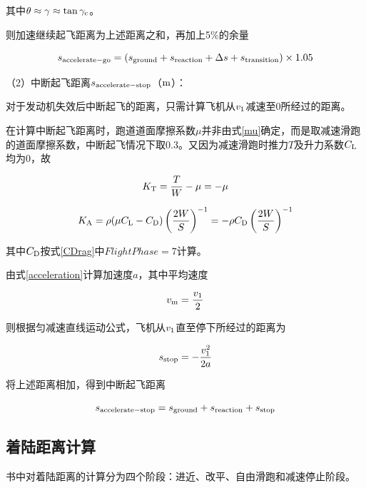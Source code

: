 \documentclass[a4paper,punct,space,heading=true,AutoFakeBold]{ctexrep}
\begin{document}
其中$\theta\approx\gamma\approx\tan\gamma_{\rm c}$。

则加速继续起飞距离为上述距离之和，再加上5\%的余量

\begin{equation}
s_{\rm accelerate-go}=\left(s_{\rm ground}+s_{\rm reaction}+\Delta s+s_{\rm transition}\right)\times 1.05
\end{equation}

（2）中断起飞距离$s_{\rm accelerate-stop}$（$\rm m$）：

对于发动机失效后中断起飞的距离，只需计算飞机从$v_{\rm 1}$减速至0所经过的距离。

在计算中断起飞距离时，跑道道面摩擦系数$\mu$并非由式\ref{mu}确定，而是取减速滑跑的道面摩擦系数，中断起飞情况下取0.3。又因为减速滑跑时推力$T$及升力系数$C_{\rm L}$均为0，故

\begin{equation}\label{KTwithoutT}
K_{\rm T}=\frac{T}{W}-\mu=-\mu
\end{equation}

\begin{equation}\label{KAwithoutCL}
K_{\rm A}=\rho(\mu C_{\rm L}-C_{\rm D})\left(\frac{2W}{S}\right)^{-1}=-\rho C_{\rm D}\left(\frac{2W}{S}\right)^{-1}
\end{equation}

其中$C_{\rm D}$按式\ref{CDrag}中$FlightPhase=7$计算。

由式\ref{acceleration}计算加速度$a$，其中平均速度

\begin{equation}
v_{\rm m}=\frac{v_{\rm 1}}{2}
\end{equation}

则根据匀减速直线运动公式，飞机从$v_{\rm 1}$直至停下所经过的距离为

\begin{equation}
s_{\rm stop}=-\frac{v_{\rm 1}^2}{2a}
\end{equation}

将上述距离相加，得到中断起飞距离

\begin{equation}
s_{\rm accelerate-stop}=s_{\rm ground}+s_{\rm reaction}+s_{\rm stop}
\end{equation}



\subsection{着陆距离计算}

书中对着陆距离的计算分为四个阶段：进近、改平、自由滑跑和减速停止阶段。
\end{document}
